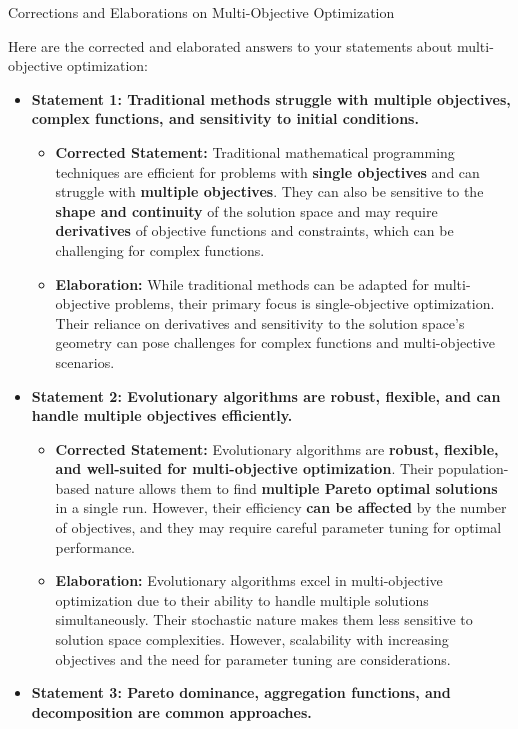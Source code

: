\documentclass[
]{article}
\author{}
\date{}
\begin{document}
{Corrections and Elaborations on Multi-Objective
Optimization}\label{corrections-and-elaborations-on-multi-objective-optimization}

Here are the corrected and elaborated answers to your statements about
multi-objective optimization:

\begin{itemize}
\item
  \textbf{Statement 1: Traditional methods struggle with multiple
  objectives, complex functions, and sensitivity to initial conditions.}

  \begin{itemize}
  
  \item
    \textbf{Corrected Statement:} Traditional mathematical programming
    techniques are efficient for problems with \textbf{single
    objectives} and can struggle with \textbf{multiple objectives}. They
    can also be sensitive to the \textbf{shape and continuity} of the
    solution space and may require \textbf{derivatives} of objective
    functions and constraints, which can be challenging for complex
    functions.
  \item
    \textbf{Elaboration:} While traditional methods can be adapted for
    multi-objective problems, their primary focus is single-objective
    optimization. Their reliance on derivatives and sensitivity to the
    solution space's geometry can pose challenges for complex functions
    and multi-objective scenarios.
  \end{itemize}
\item
  \textbf{Statement 2: Evolutionary algorithms are robust, flexible, and
  can handle multiple objectives efficiently.}

  \begin{itemize}
  
  \item
    \textbf{Corrected Statement:} Evolutionary algorithms are
    \textbf{robust, flexible, and well-suited for multi-objective
    optimization}. Their population-based nature allows them to find
    \textbf{multiple Pareto optimal solutions} in a single run. However,
    their efficiency \textbf{can be affected} by the number of
    objectives, and they may require careful parameter tuning for
    optimal performance.
  \item
    \textbf{Elaboration:} Evolutionary algorithms excel in
    multi-objective optimization due to their ability to handle multiple
    solutions simultaneously. Their stochastic nature makes them less
    sensitive to solution space complexities. However, scalability with
    increasing objectives and the need for parameter tuning are
    considerations.
  \end{itemize}
\item
  \textbf{Statement 3: Pareto dominance, aggregation functions, and
  decomposition are common approaches.}


\end{itemize}
\end{document}
